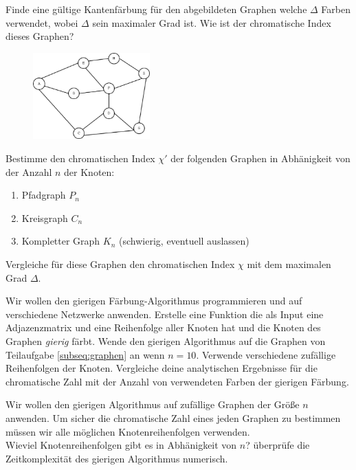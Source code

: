 Finde eine g\"ultige Kantenf\"arbung f\"ur den abgebildeten Graphen welche $\Delta$ Farben verwendet, wobei $\Delta$ sein maximaler Grad ist. Wie ist der chromatische Index dieses Graphen?

\begin{figure}[h]
\includegraphics[width=0.4\textwidth]{graph_colouring.eps}
\end{figure}

\subexercise[%
  topic=Kantenf\"arbung bestimmter Graphen,
    ]
Bestimme den chromatischen Index $\chi'$ der folgenden Graphen in Abh\"anigkeit von der Anzahl $n$ der Knoten:

\begin{enumerate}
\item Pfadgraph $P_n$
\item Kreisgraph $C_n$
\item Kompletter Graph $K_n$ (schwierig, eventuell auslassen)
\end{enumerate}

Vergleiche f\"ur diese Graphen den chromatischen Index $\chi$ mit dem maximalen Grad $\Delta$.


\exercise[%
  topic = Gierige F\"arbung Programmieren
    ]

Wir wollen den gierigen F\"arbung-Algorithmus programmieren und auf verschiedene Netzwerke anwenden.
\subexercise[%
  topic=Gierige F\"arbung,
    ]
		Erstelle eine Funktion die als Input eine Adjazenzmatrix und eine Reihenfolge aller Knoten hat und die Knoten des Graphen \emph{gierig} f\"arbt.
\subexercise[%
  topic=Gierige F\"arbung von bestimmten Graphen,
    ]
Wende den gierigen Algorithmus auf die Graphen von Teilaufgabe \ref{subseq:graphen} an wenn $n=10$. Verwende verschiedene zuf\"allige Reihenfolgen der Knoten. Vergleiche deine analytischen Ergebnisse f\"ur die chromatische Zahl mit der Anzahl von verwendeten Farben der gierigen F\"arbung.
		
		
		\subexercise[%
  topic=Zeitkomplexit\"at des gierigen F\"arbe-Algorithmus,
    ]

Wir wollen den gierigen Algorithmus auf zuf\"allige Graphen der Gr\"o\ss e $n$ anwenden. Um sicher die chromatische Zahl eines jeden Graphen zu bestimmen m\"ussen wir alle m\"oglichen Knotenreihenfolgen verwenden.\\
Wieviel Knotenreihenfolgen gibt es in Abh\"anigkeit von $n$? \"uberpr\"ufe die Zeitkomplexit\"at des gierigen Algorithmus numerisch.
		
